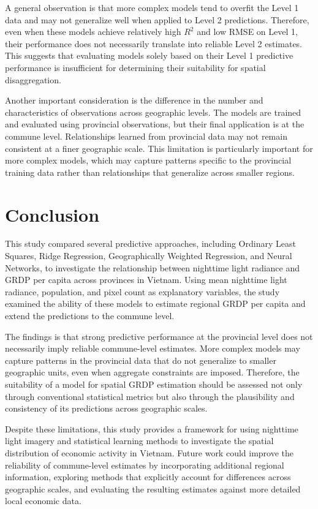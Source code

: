 \documentclass[11pt]{article} %
\begin{document}
A general observation is that more complex models tend to overfit the Level 1 data and may not generalize well when applied to Level 2 predictions. Therefore, even when these models achieve relatively high $R^2$ and low RMSE on Level 1, their performance does not necessarily translate into reliable Level 2 estimates. This suggests that evaluating models solely based on their Level 1 predictive performance is insufficient for determining their suitability for spatial disaggregation.

Another important consideration is the difference in the number and characteristics of observations across geographic levels. The models are trained and evaluated using provincial observations, but their final application is at the commune level. Relationships learned from provincial data may not remain consistent at a finer geographic scale. This limitation is particularly important for more complex models, which may capture patterns specific to the provincial training data rather than relationships that generalize across smaller regions.

\section{Conclusion}

This study compared several predictive approaches, including Ordinary Least Squares, Ridge Regression, Geographically Weighted Regression, and Neural Networks, to investigate the relationship between nighttime light radiance and GRDP per capita across provinces in Vietnam. Using mean nighttime light radiance, population, and pixel count as explanatory variables, the study examined the ability of these models to estimate regional GRDP per capita and extend the predictions to the commune level.

The findings is that strong predictive performance at the provincial level does not necessarily imply reliable commune-level estimates. More complex models may capture patterns in the provincial data that do not generalize to smaller geographic units, even when aggregate constraints are imposed. Therefore, the suitability of a model for spatial GRDP estimation should be assessed not only through conventional statistical metrics but also through the plausibility and consistency of its predictions across geographic scales.

Despite these limitations, this study provides a framework for using nighttime light imagery and statistical learning methods to investigate the spatial distribution of economic activity in Vietnam. Future work could improve the reliability of commune-level estimates by incorporating additional regional information, exploring methods that explicitly account for differences across geographic scales, and evaluating the resulting estimates against more detailed local economic data.



\newpage
\printbibliography %
\end{document}
